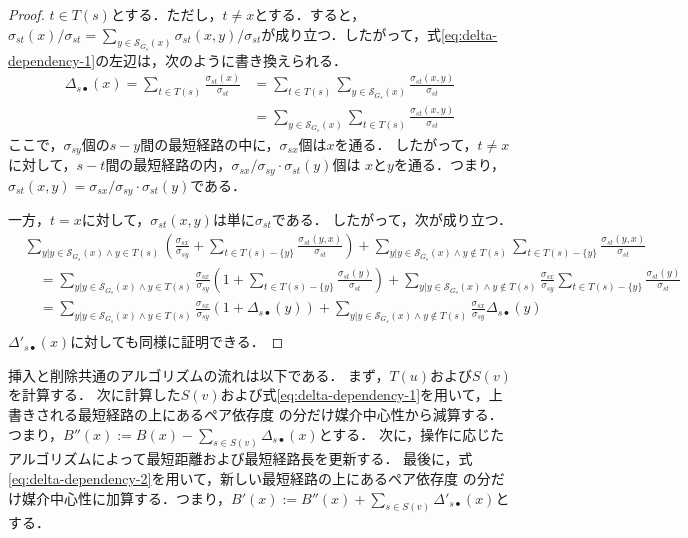 \begin{proof}
  $t\in T(s)$とする．ただし，$t\neq x$とする．すると，$\sigma_{st}(x)/\sigma_{st}=\sum_{y\in\mathcal{S}_{G_s}(x)}\sigma_{st}(x,y)/\sigma_{st}$が成り立つ．したがって，式\ref{eq:delta-dependency-1}の左辺は，次のように書き換えられる．
  \begin{equation*}
    \begin{aligned}
      \Delta_{s\bullet}(x)=\sum_{t\in T(s)}\frac{\sigma_{st}(x)}{\sigma_{st}}
      &=\sum_{t\in T(s)}\sum_{y\in\mathcal{S}_{G_s}(x)}\frac{\sigma_{st}(x,y)}{\sigma_{st}}\\
      &=\sum_{y\in\mathcal{S}_{G_s}(x)}\sum_{t\in T(s)}\frac{\sigma_{st}(x,y)}{\sigma_{st}}
    \end{aligned}
  \end{equation*}
  ここで，$\sigma_{sy}$個の$s-y$間の最短経路の中に，$\sigma_{sx}$個は$x$を通る．
  したがって，$t\neq x$に対して，$s-t$間の最短経路の内，$\sigma_{sx}/\sigma_{sy}\cdot\sigma_{st}(y)$個は
  $x$と$y$を通る．つまり，$\sigma_{st}(x,y)=\sigma_{sx}/\sigma_{sy}\cdot\sigma_{st}(y)$である．

  一方，$t=x$に対して，$\sigma_{st}(x,y)$は単に$\sigma_{st}$である．
  したがって，次が成り立つ．
  \begin{equation*}
    \begin{aligned}
      &\sum_{y|y\in\mathcal{S}_{G_s}(x)\land y\in T(s)}\left(\frac{\sigma_{sx}}{\sigma_{sy}}+\sum_{t\in T(s)-\{y\}}\frac{\sigma_{st}(y,x)}{\sigma_{st}}\right)
      +\sum_{y|y\in\mathcal{S}_{G_s}(x)\land y\notin T(s)}\sum_{t\in T(s)-\{y\}}\frac{\sigma_{st}(y,x)}{\sigma_{st}} \\
      &\quad=\sum_{y|y\in\mathcal{S}_{G_s}(x)\land y\in T(s)}\frac{\sigma_{sx}}{\sigma_{sy}}\left(1+\sum_{t\in T(s)-\{y\}}\frac{\sigma_{st}(y)}{\sigma_{st}}\right)
      +\sum_{y|y\in\mathcal{S}_{G_s}(x)\land y\notin T(s)}\frac{\sigma_{sx}}{\sigma_{sy}}\sum_{t\in T(s)-\{y\}}\frac{\sigma_{st}(y)}{\sigma_{st}} \\
      &\quad=\sum_{y|y\in\mathcal{S}_{G_s}(x)\land y\in T(s)}\frac{\sigma_{sx}}{\sigma_{sy}}\left(1+\Delta_{s\bullet}(y)\right)
      +\sum_{y|y\in\mathcal{S}_{G_s}(x)\land y\notin T(s)}\frac{\sigma_{sx}}{\sigma_{sy}}\Delta_{s\bullet}(y) \\
    \end{aligned}
  \end{equation*}
  $\Delta'_{s\bullet}(x)$に対しても同様に証明できる．
\end{proof}

挿入と削除共通のアルゴリズムの流れは以下である．
まず，$T(u)$および$S(v)$を計算する．
次に計算した$S(v)$および式\eqref{eq:delta-dependency-1}を用いて，上書きされる最短経路の上にあるペア依存度
の分だけ媒介中心性から減算する．つまり，$B''(x):=B(x)-\sum_{s\in S(v)}\Delta_{s\bullet}(x)$とする．
次に，操作に応じたアルゴリズムによって最短距離および最短経路長を更新する．
最後に，式\eqref{eq:delta-dependency-2}を用いて，新しい最短経路の上にあるペア依存度
の分だけ媒介中心性に加算する．つまり，$B'(x):=B''(x)+\sum_{s\in S(v)}\Delta'_{s\bullet}(x)$とする．

